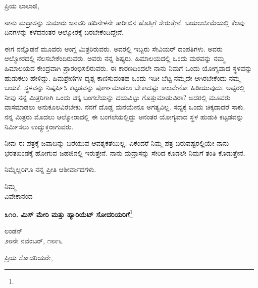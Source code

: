 \noindent
ಪ್ರಿಯ ಲಾಲಾಜಿ,

\vspace{0.15cm}

ನಾನು ಮದ್ರಾಸನ್ನು ಸುಮಾರು ಜನವರಿ ಹದಿನೇಳನೇ ತಾರೀಖಿನ ಹೊತ್ತಿಗೆ ಸೇರುತ್ತೇನೆ. ಬಯಲುಸೀಮೆಯಲ್ಲಿ ಕೆಲವು ದಿನಗಳನ್ನು ಕಳೆದನಂತರ ಆಲ್ಮೋರಕ್ಕೆ ಬರಬೇಕೆಂದಿದ್ದೇನೆ.

\vspace{0.15cm}

ಈಗ ನನ್ನೊಡನೆ ಮೂವರು ಆಂಗ್ಲ ಮಿತ್ರರಿರುವರು. ಅವರಲ್ಲಿ ಇಬ್ಬರು ಸೇವಿಯರ್ ದಂಪತಿಗಳು. ಅವರು ಆಲ್ಮೋರದಲ್ಲಿ ನೆಲಸಬೇಕೆಂದಿರುವರು. ಅವರು ನನ್ನ ಶಿಷ್ಯರು. ಹಿಮಾಲಯದಲ್ಲಿ ಒಂದು ಮಠವನ್ನು ನಮ್ಮ ಹಿಮಾಲಯದ ಕೇಂದ್ರವಾಗಿ ಪ್ರಾರಂಭಿಸಲಿರುವರು. ಈ ಕಾರಣದಿಂದಲೇ ನಾನು ನಿಮಗೆ ಒಂದು ಯೋಗ್ಯವಾದ ಸ್ಥಳವನ್ನು ಹುಡುಕಲು ಹೇಳಿದ್ದು. ಹಿಮಶ್ರೇಣಿಗಳ ದೃಶ್ಯ ಕಾಣಿಸುವಂತಹ ಒಂದು ಇಡೀ ಬೆಟ್ಟ ನಮ್ಮದೇ ಆಗಿರಬೇಕೆಂದು ನಮ್ಮ ಬಯಕೆ. ಸ್ಥಳವನ್ನು ನಿಷ್ಕರ್ಷಿಸಿ ಕಟ್ಟಡವನ್ನು ಪೂರ್ಣಮಾಡಲು ಬೇಕಾದಷ್ಟು ಕಾಲವೇನೋ ಹಿಡಿಯುವುದು. ಅಷ್ಟರಲ್ಲಿ ನೀವು ನನ್ನ ಮಿತ್ರರಿಗಾಗಿ ಒಂದು ಚಿಕ್ಕ ಬಂಗಲೆಯನ್ನು ದಯವಿಟ್ಟು ಗೊತ್ತುಮಾಡುವಿರಾ? ಅದರಲ್ಲಿ ಮೂವರು ವಾಸಮಾಡಲು ಅನುಕೂಲವಿರಬೇಕು. ನನಗೆ ದೊಡ್ಡ ಮನೆಯೇನೂ ಅಗತ್ಯವಿಲ್ಲ. ಸದ್ಯಕ್ಕೆ ಒಂದು ಚಿಕ್ಕದಾದರೆ ಸಾಕು. ನನ್ನ ಮಿತ್ರರು ಮೊದಲು ಆಲ್ಮೋರಾದಲ್ಲಿ ಈ ಬಂಗಲೆಯಲ್ಲಿದ್ದು ಅನಂತರ ಯೋಗ್ಯವಾದ ಸ್ಥಳ ಹುಡುಕಿ ಕಟ್ಟಡವನ್ನು ನಿರ್ಮಿಸಲು ಉದ್ಯುಕ್ತರಾಗುವರು.

\vspace{0.15cm}

ನೀವು ಈ ಪತ್ರಕ್ಕೆ ಜವಾಬನ್ನು ಬರೆಯುವ ಆವಶ್ಯಕತೆಯಿಲ್ಲ. ಏಕೆಂದರೆ ನಿಮ್ಮ ಪತ್ರ ಬರುವಷ್ಟರಲ್ಲಿಯೇ ನಾನು ಭರತಖಂಡಕ್ಕೆ ಹೋಗುವ ಜಹಜಿನಲ್ಲಿ ಇರುತ್ತೇನೆ. ನಾನು ಮದ್ರಾಸನ್ನು ಸೇರಿದ ಕೂಡಲೇ ನಿಮಗೆ ತಂತಿ ಕೊಡುತ್ತೇನೆ.

\vspace{0.15cm}

ನಿಮ್ಮೆಲ್ಲರಿಗೂ ನನ್ನ ಪ್ರೀತಿ ಆಶೀರ್ವಾದಗಳು.

{\flushright
ನಿಮ್ಮ\\ವಿವೇಕಾನಂದ\par}

\begin{center}
\textbf{೩೧೦. ಮಿಸ್ ಮೇರಿ ಮತ್ತು ಹ್ಯಾರಿಯೆಟ್ ಸೋದರಿಯರಿಗೆ}\footnote{}
\end{center}

\begin{flushright}
ಲಂಡನ್\\೨೮ನೇ ನವೆಂಬರ್, ೧೮೯೬
\end{flushright}

\noindent
ಪ್ರಿಯ ಸೋದರಿಯರೇ,

